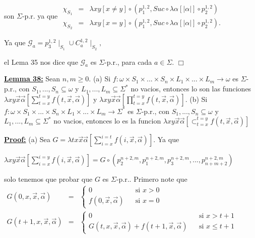   son \(\Sigma \)-p.r. ya que
  \(\displaystyle \begin{array}{rcl} \chi _{S_{1}} & =& \lambda xy\left[ x\neq y\right] \circ \left( p_{1}^{1,2},Suc\circ \lambda \alpha \left[ \left\vert \alpha \right\vert \right] \circ p_{2}^{1,2}\right) \\ \chi _{S_{2}} & =& \lambda xy\left[ x=y\right] \circ \left( p_{1}^{1,2},Suc\circ \lambda \alpha \left[ \left\vert \alpha \right\vert \right] \circ p_{2}^{1,2}\right) . \end{array} \)

  Ya que
  \(\displaystyle \mathcal{G}_{a}=p_{3}^{1,2}\mid _{S_{1}}\cup C_{a}^{1,2}\mid _{S_{2}}, \)

  el Lema 35 nos dice que \(\mathcal{G}_{a}\) es \(\Sigma \)-p.r., para cada \(a\in \Sigma \). \(\Box\)


  \textbf{\underline{Lemma 38:}} Sean \(n,m\geq 0\).
  (a) Si \(f:\omega \times S_{1}\times ...\times S_{n}\times L_{1}\times ...\times L_{m}\rightarrow \omega \) es \(\Sigma \)-p.r., con \( S_{1},...,S_{n}\subseteq \omega \) y \(L_{1},...,L_{m}\subseteq \Sigma ^{\ast } \) no vacios, entonces lo son las funciones \(\lambda xy\vec{x}\vec{\alpha} \left[ \sum_{t=x}^{t=y}f(t,\vec{x},\vec{\alpha})\right] \) y \(\lambda xy\vec{x }\vec{\alpha}\left[ \prod_{t=x}^{t=y}f(t,\vec{x},\vec{\alpha})\right] \).
  (b) Si \(f:\omega \times S_{1}\times ...\times S_{n}\times L_{1}\times ...\times L_{m}\rightarrow \Sigma ^{\ast }\) es \(\Sigma \)-p.r., con \( S_{1},...,S_{n}\subseteq \omega \) y \(L_{1},...,L_{m}\subseteq \Sigma ^{\ast } \) no vacios, entonces lo es la funcion \(\lambda xy\vec{x}\vec{\alpha}\left[ \subset _{t=x}^{t=y}f(t,\vec{x},\vec{\alpha})\right] \)

  \textbf{\underline{Proof:}} (a) Sea \(G=\lambda tx\vec{x}\vec{\alpha}\left[ \sum_{i=x}^{i=t}f(i,\vec{x}, \vec{\alpha})\right] \). Ya que

  \(\displaystyle \lambda xy\vec{x}\vec{\alpha}\left[ \sum_{i=x}^{i=y}f(i,\vec{x},\vec{\alpha}) \right] =G\circ \left( p_{2}^{n+2,m},p_{1}^{n+2,m},p_{3}^{n+2,m},...,p_{n+m+2}^{n+2,m}\right) \)

  solo tenemos que probar que \(G\) es \(\Sigma \)-p.r.. Primero note que
  \(\displaystyle \begin{array}{rcl} G(0,x,\vec{x},\vec{\alpha}) & =& \left\{ \begin{array}{lll} 0 & & \text{si }x >0 \\ f(0,\vec{x},\vec{\alpha}) & & \text{si }x=0 \end{array} \right. \\ G(t+1,x,\vec{x},\vec{\alpha}) & =& \left\{ \begin{array}{lll} 0 & & \text{si }x >t+1 \\ G(t,x,\vec{x},\vec{\alpha})+f(t+1,\vec{x},\vec{\alpha}) & & \text{si }x\leq t+1 \end{array} \right. \end{array} \)

